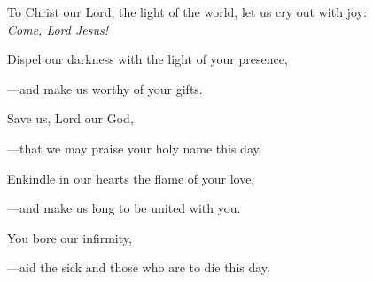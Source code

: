 \intercessions\indent

\begin{hangpar}

To Christ our Lord, the light of the world, let us cry out with joy:\\
\emph{Come, Lord Jesus!}

\medskip Dispel our darkness with the light of your presence,

{\color{red}---\thinspace}and make us worthy of your gifts.

\medskip Save us, Lord our God,

{\color{red}---\thinspace}that we may praise your holy name this day.

\medskip Enkindle in our hearts the flame of your love,

{\color{red}---\thinspace}and make us long to be united with you.

\medskip You bore our infirmity,

{\color{red}---\thinspace}aid the sick and those who are to die this day.

\end{hangpar}